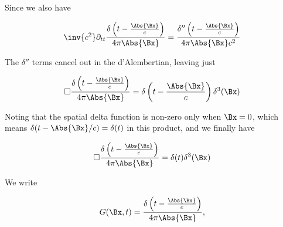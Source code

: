 Since we also have

\begin{equation}\label{eqn:relativisticElectrodynamicsL18:500}
\inv{c^2} \partial_{tt}
\frac{\delta\left(t - \frac{\Abs{\Bx}}{c}\right)}{4 \pi \Abs{\Bx} }
=
\frac{\delta''\left(t - \frac{\Abs{\Bx}}{c}\right)}{4 \pi \Abs{\Bx} c^2}
\end{equation}

The $\delta''$ terms cancel out in the d'Alembertian, leaving just

\begin{equation}\label{eqn:relativisticElectrodynamicsL18:460}
\square \frac{\delta\left(t - \frac{\Abs{\Bx}}{c}\right)}{4 \pi \Abs{\Bx} }
=
\delta\left(t - \frac{\Abs{\Bx}}{c}\right) \delta^3(\Bx) 
\end{equation}

Noting that the spatial delta function is non-zero only when $\Bx = 0$, which means $\delta(t - \Abs{\Bx}/c) = \delta(t)$ in this product, and we finally have

\begin{equation}\label{eqn:relativisticElectrodynamicsL18:480}
\square \frac{\delta\left(t - \frac{\Abs{\Bx}}{c}\right)}{4 \pi \Abs{\Bx} }
=
\delta(t) \delta^3(\Bx) 
\end{equation}

We write

\begin{equation}\label{eqn:relativisticElectrodynamicsL18:520}
G(\Bx, t) = \frac{\delta\left(t - \frac{\Abs{\Bx}}{c}\right)}{4 \pi \Abs{\Bx} },
\end{equation}
